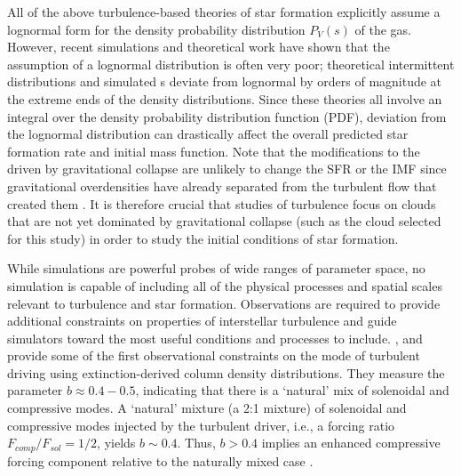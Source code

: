 
All of the above turbulence-based theories of star formation explicitly assume a
lognormal form for the density probability distribution $P_V(s)$ of the gas. %
However, recent simulations \citep{Kritsuk2007a, Schmidt2009a, Federrath2010a, Federrath2013a, Federrath2013b} and theoretical work
\citep{Hopkins2013a} have shown that the assumption of a
lognormal distribution is often very poor; theoretical intermittent distributions and 
simulated \rhoPDF s deviate from lognormal by orders of magnitude
at the extreme ends of the density distributions.  Since these theories all involve
an integral over the density probability distribution function (PDF), deviation from
the lognormal distribution can drastically affect the overall predicted star formation
rate \citep[e.g.][]{Cho2011a,Collins2012a} and initial mass function.
Note that the modifications to the \rhoPDF driven by gravitational collapse
are unlikely to change the SFR or the IMF since gravitational overdensities have already
separated from the turbulent flow that created them
\citep{Klessen2000a,Kritsuk2011a,Federrath2012a,Federrath2013a}. It is therefore crucial that
studies of turbulence focus on clouds that are not yet dominated by
gravitational collapse (such as the cloud selected for this study) in order to study the initial conditions of star formation.

While simulations are powerful probes of wide ranges of parameter space, no
simulation is capable of including all of the physical processes and spatial
scales relevant to turbulence and star formation.  Observations are required to provide additional
constraints on properties of interstellar turbulence and guide simulators
toward the most useful conditions and processes to include.
\citet{Brunt2010c}, \citet{Kainulainen2012a} and \citet{Kainulainen2013a}
provide some of the first observational constraints on the mode of turbulent
driving using extinction-derived column density distributions.
They measure the parameter $b\approx0.4-0.5$, indicating that there is a `natural' mix of solenoidal
and compressive modes.  A `natural' mixture (a 2:1 mixture) of solenoidal and
compressive modes injected by the turbulent driver, i.e., a forcing ratio
$F_{comp}/F_{sol} = 1/2$, yields $b\sim0.4$. Thus, $b>0.4$ implies an enhanced
compressive forcing component relative to the naturally mixed case \citep[see
Figure 8 in][]{Federrath2010a}.


